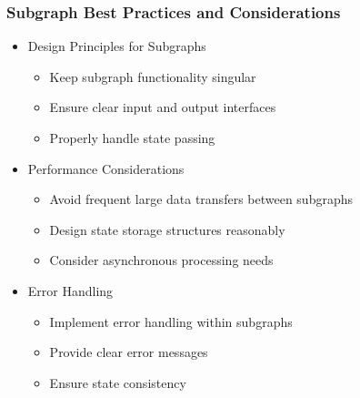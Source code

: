\begin{frame}[fragile]\frametitle{Subgraph Best Practices and Considerations}

      \begin{itemize}
        \item Design Principles for Subgraphs
		      \begin{itemize}
				\item Keep subgraph functionality singular
				\item Ensure clear input and output interfaces
				\item Properly handle state passing
			  \end{itemize}

        \item Performance Considerations
		      \begin{itemize}
				\item Avoid frequent large data transfers between subgraphs
				\item Design state storage structures reasonably
				\item Consider asynchronous processing needs
			  \end{itemize}

        \item Error Handling
		      \begin{itemize}
				\item Implement error handling within subgraphs
				\item Provide clear error messages
				\item Ensure state consistency
			  \end{itemize}

      \end{itemize}
\end{frame}
